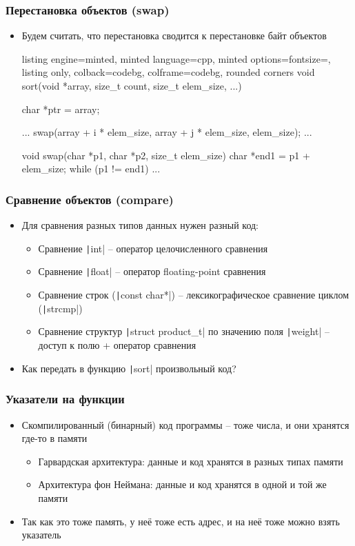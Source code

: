 \documentclass[10pt]{beamer}
\begin{document}
\begin{frame}[fragile]
\frametitle{Перестановка объектов (swap)}
\begin{itemize}
\item Будем считать, что перестановка сводится к перестановке байт объектов
\begin{tcblisting}{listing engine=minted, minted language=cpp, minted options={fontsize=\scriptsize}, listing only, colback=codebg, colframe=codebg, rounded corners}
void sort(void *array, size_t count, size_t elem_size, ...) {
  char *ptr = array;

  ...
  swap(array + i * elem_size, array + j * elem_size, elem_size);
  ...
}

void swap(char *p1, char *p2, size_t elem_size) {
  char *end1 = p1 + elem_size;
  while (p1 != end1) {
    ...
  }
}
\end{tcblisting}
\end{itemize}
\end{frame}

\begin{frame}[fragile]
\frametitle{Сравнение объектов (compare)}
\begin{itemize}
\item Для сравнения разных типов данных нужен разный код:
\pause
\begin{itemize}
\item Сравнение \texttt|int| -- оператор целочисленного сравнения
\pause
\item Сравнение \texttt|float| -- оператор floating-point сравнения
\pause
\item Сравнение строк (\texttt|const char*|) -- лексикографическое сравнение циклом (\texttt|strcmp|)
\pause
\item Сравнение структур \texttt|struct product_t| по значению поля \texttt|weight| -- доступ к полю + оператор сравнения
\end{itemize}
\pause
\item Как передать в функцию \texttt|sort| произвольный код?
\end{itemize}
\end{frame}

\begin{frame}[fragile]
\frametitle{Указатели на функции}
\begin{itemize}
\item Скомпилированный (бинарный) код программы -- тоже числа, и они хранятся где-то в памяти
\pause
\begin{itemize}
\item Гарвардская архитектура: данные и код хранятся в разных типах памяти
\pause
\item Архитектура фон Неймана: данные и код хранятся в одной и той же памяти
\end{itemize}
\pause
\item Так как это тоже память, у неё тоже есть адрес, и на неё тоже можно взять указатель
\end{itemize}
\end{frame}
\end{document}
